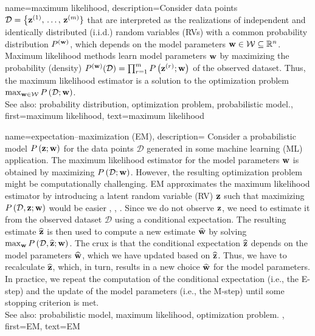 {
{name={maximum likelihood}, 
	description={Consider data points 
	$\mathcal{D}=\big\{ {\bf z}^{(1)}, \,\ldots, \,{\bf z}^{(m)} \}$ 
	that are interpreted as the realizations of independent and identically distributed (i.i.d.) random variables (RVs) 
	with a common probability distribution $P^{({\bf w})}$, which depends 
	on the model parameters ${\bf w} \in \mathcal{W} \subseteq \mathbb{R}^{n}$. 
		Maximum likelihood methods learn model parameters ${\bf w}$ by maximizing 
		the probability (density) $P^{({\bf w})}(\mathcal{D}) = \prod_{r=1}^{m} P\left({\bf z}^{(r)}; {\bf w}\right)$ 
		of the observed dataset. Thus, the maximum likelihood estimator is a 
		solution to the optimization problem $\max_{{\bf w} \in \mathcal{W}} P\left(\mathcal{D}; {\bf w}\right)$.
				\\
		See also: probability distribution, optimization problem, probabilistic model.},
	first={maximum likelihood},
	text={maximum likelihood}
}


{name={expectation–maximization (EM)}, 
	description={ 
		Consider a probabilistic model $P\left({\bf z}; {\bf w}\right)$ for the data points $\mathcal{D}$ generated in some 
		machine learning (ML) application. The maximum likelihood estimator for the model parameters ${\bf w}$ is obtained by maximizing 
		$P\left(\mathcal{D}; {\bf w}\right)$. However, the resulting optimization problem might be computationally 
		challenging. EM approximates the maximum likelihood estimator by introducing a latent 
		random variable (RV) ${\bf z}$ such that maximizing $P\left(\mathcal{D},{\bf z}; {\bf w}\right)$ would be easier 
		\cite{hastie01statisticallearning}, \cite{BishopBook}, \cite{GraphModExpFamVarInfWainJor}. Since we 
		do not observe ${\bf z}$, we need to estimate it from the observed dataset $\mathcal{D}$ 
		using a conditional expectation. The resulting estimate $\widehat{{\bf z}}$ is then used to 
		compute a new estimate $\widehat{{\bf w}}$ by solving $\max_{{\bf w}} P\left(\mathcal{D}, \widehat{{\bf z}}; {\bf w}\right)$. 
		The crux is that the conditional expectation $\widehat{{\bf z}}$ depends on the model parameters $\widehat{{\bf w}}$, 
		which we have updated based on $\widehat{{\bf z}}$. Thus, we have to recalculate $\widehat{{\bf z}}$, 
		which, in turn, results in a new choice $\widehat{{\bf w}}$ for the model parameters. In practice, 
		we repeat the computation of the conditional expectation (i.e., the E-step) and the update 
		of the model parameters (i.e., the M-step) until some stopping criterion is met. 
				\\
		See also: probabilistic model, maximum likelihood, optimization problem. },
	first={EM},
	text={EM}
}


}
